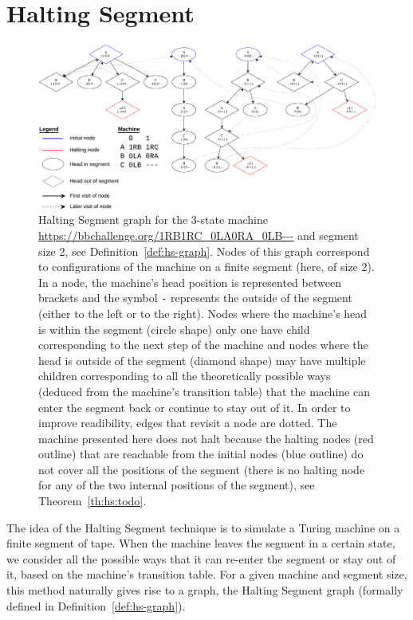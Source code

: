 \newcommand{\HS}{Halting Segment\xspace}

\section{Halting Segment}\label{sec:halting-segment}

\begin{figure}[h!]
  \centering
  \includegraphics[width=1\textwidth]{halting-segment.pdf}
  \caption{\HS graph for the 3-state machine \url{https://bbchallenge.org/1RB1RC_0LA0RA_0LB---} and segment size 2, see Definition~\ref{def:hs-graph}. Nodes of this graph correspond to configurations of the machine on a finite segment (here, of size 2). In a node, the machine's head position is represented between brackets and the symbol \texttt{-} represents the outside of the segment (either to the left or to the right). Nodes where the machine's head is within the segment (circle shape) only one have child corresponding to the next step of the machine and nodes where the head is outside of the segment (diamond shape) may have multiple children corresponding to all the theoretically possible ways (deduced from the machine's transition table) that the machine can enter the segment back or continue to stay out of it. In order to improve readibility, edges that revisit a node are dotted. The machine presented here does not halt because the halting nodes (red outline) that are reachable from the initial nodes (blue outline) do not cover all the positions of the segment (there is no halting node for any of the two internal positions of the segment), see Theorem~\ref{th:hs:todo}. }\label{fig:hs}
\end{figure}

The idea of the \HS technique is to simulate a Turing machine on a finite segment of tape. When the machine leaves the segment in a certain state, we consider all the possible ways that it can re-enter the segment or stay out of it, based on the machine's transition table. For a given machine and segment size, this method naturally gives rise to a graph, the \HS graph (formally defined in Definition~\ref{def:hs-graph}).

